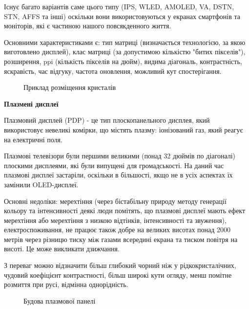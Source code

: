 \documentclass[a4paper]{article}
\begin{document}
Існує багато варіантів саме цього типу (IPS, WLED, AMOLED, VA, DSTN, STN, AFFS та інші) оскільки вони використовуються у екранах смартфонів та моніторів, які є частиною нашого повсякденного життя.

Основними характеристиками є: тип матриці (визначається технологією, за якою виготовлено дисплей), клас матриці (за допустимою кількістю "битих пікселів"), розширення, ppi (кількість пікселів на дюйм), видима діагональ, контрастність, яскравість, час відгуку, частота оновлення, можливий кут спостерігання.

\begin{figure}[ht]
\caption{Приклад розміщення кристалів}
\end{figure}

\textbf{Плазмені дисплеї}

Плазмовий дисплей (PDP) - це тип плоскопанельного дисплея, який використовує невеликі комірки, що містять плазму: іонізований газ, який реагує на електричні поля.

Плазмові телевізори були першими великими (понад 32 дюймів по діагоналі) плоскими дисплеями, які були випущені для громадськості. На даний час плазмові дисплеї застаріли, оскільки в більшості, якщо не в усіх аспектах їх замінили OLED-дисплеї. 


Основні недоліки: мерехтіння (через бістабільну природу методу генерації кольору та інтенсивності деякі люди помітять, що плазмові дисплеї мають ефект мерехтіння або мерехтіння з низкою відтінків, інтенсивності та звуження), електроспоживання, не працює також добре на великих висотах понад 2000 метрів через різницю тиску між газами всередині екрана та тиском повітря на висоті. Це може викликати дзижчання.

З переваг можно відзначити більш глибокий чорний ніж у рідкокристалічних, чудовий коефіцієнт контрастності, більш широкі кути огляду, менш помітне розмиття при русі, відмінна однорідність.

\begin{figure}[ht]
\caption{Будова плазмової панелі}
\end{figure}
\end{document}
